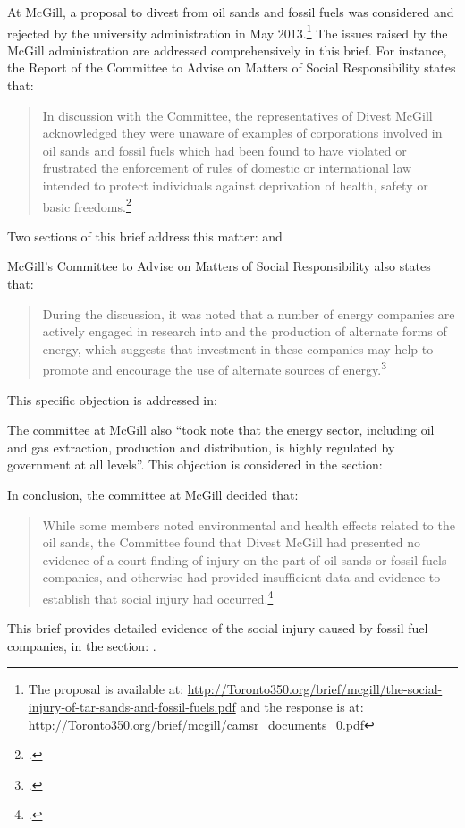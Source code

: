 At McGill, a proposal to divest from oil sands and fossil fuels was considered and rejected by the university administration in May 2013.\footnote{The proposal is available at: \url{http://Toronto350.org/brief/mcgill/the-social-injury-of-tar-sands-and-fossil-fuels.pdf} and the response is at: \url{http://Toronto350.org/brief/mcgill/camsr_documents_0.pdf}}
The issues raised by the McGill administration are addressed comprehensively in this brief.
For instance, the Report of the Committee to Advise on Matters of Social Responsibility states that:
\begin{quote}
In discussion with the Committee, the representatives of Divest McGill acknowledged they were unaware of examples of corporations involved in oil sands and fossil fuels which had been found to have violated or frustrated the enforcement of rules of domestic or international law intended to protect individuals against deprivation of health, safety or basic freedoms.\footcite[][p. 4]{McGillRejection}
\end{quote}
Two sections of this brief address this matter:  and 



McGill's Committee to Advise on Matters of Social Responsibility also states that:
\begin{quote}
During the discussion, it was noted that a number of energy companies are actively engaged in research into and the production of alternate forms of energy, which suggests that investment in these companies may help to promote and encourage the use of alternate sources of energy.\footcite[][p. 4]{McGillRejection}
\end{quote}
This specific objection is addressed in: 



The committee at McGill also ``took note that the energy sector, including oil and gas extraction, production and distribution, is highly regulated by government at all levels''. This objection is considered in the section: 



In conclusion, the committee at McGill decided that:
\begin{quote}
While some members noted environmental and health effects related to the oil sands, the Committee found that Divest McGill had presented no evidence of a court finding of injury on the part of oil sands or fossil fuels companies, and otherwise had provided insufficient data and evidence to establish that social injury had occurred.\footcite[][p. 4]{McGillRejection}
\end{quote}
This brief provides detailed evidence of the social injury caused by fossil fuel companies, in the section: .



